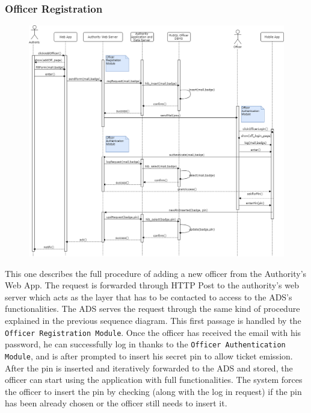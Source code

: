 \documentclass[12pt,a4paper]{article}
\begin{document}
\subsubsection{Officer Registration}
\begin{figure}[H]
\begin{adjustwidth}{-25mm}{-25mm}
				\centering				
					        \includegraphics[width=0.75\paperwidth]{Images/Off_registration}
\end{adjustwidth}
\end{figure}
This one describes the full procedure of adding a new officer from the Authority's Web App. The request is forwarded through HTTP Post to the authority's web server which acts as the layer that has to be contacted to access to the ADS's functionalities. The ADS serves the request through the same kind of procedure explained in the previous sequence diagram. This first passage is handled by the \texttt{Officer Registration Module}. Once the officer has received the email with his password, he can successfully log in thanks to the \texttt{Officer Authentication Module}, and is after prompted to insert his secret pin to allow ticket emission. After the pin is inserted and iteratively forwarded to the ADS and stored, the officer can start using the application with full functionalities. The system forces the officer to insert the pin by checking (along with the log in request) if the pin has been already chosen or the officer still needs to insert it.
\end{document}
